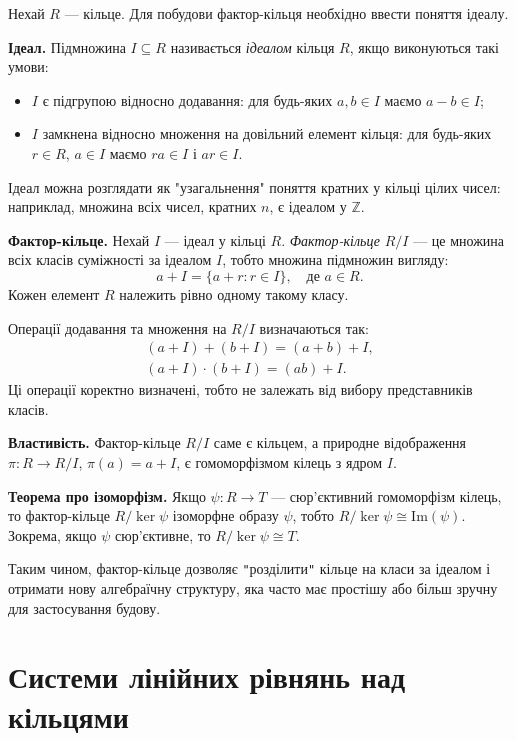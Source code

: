 Нехай \(R\) — кільце. Для побудови фактор-кільця необхідно ввести поняття ідеалу.

\textbf{Ідеал.} Підмножина \(I \subseteq R\) називається \emph{ідеалом} кільця \(R\), якщо виконуються такі умови:
\begin{itemize}
    \item \(I\) є підгрупою відносно додавання: для будь-яких \(a, b \in I\) маємо \(a-b \in I\);
    \item \(I\) замкнена відносно множення на довільний елемент кільця: для будь-яких \(r \in R\), \(a \in I\) маємо \(ra \in I\) і \(ar \in I\).
\end{itemize}
Ідеал можна розглядати як "узагальнення" поняття кратних у кільці цілих чисел: наприклад, множина всіх чисел, кратних \(n\), є ідеалом у \(\mathbb{Z}\).

\textbf{Фактор-кільце.} Нехай \(I\) — ідеал у кільці \(R\). \emph{Фактор-кільце} \(R/I\) — це множина всіх класів суміжності за ідеалом \(I\), тобто множина підмножин вигляду:
\[
    a + I = \{a + r : r \in I\}, \quad \text{де } a \in R.
\]
Кожен елемент \(R\) належить рівно одному такому класу.

Операції додавання та множення на \(R/I\) визначаються так:
\begin{gather*}
    (a + I) + (b + I) = (a + b) + I, \\
    (a + I) \cdot (b + I) = (ab) + I.
\end{gather*}
Ці операції коректно визначені, тобто не залежать від вибору представників класів.

\textbf{Властивість.} Фактор-кільце \(R/I\) саме є кільцем, а природне відображення \(\pi: R \to R/I\), \(\pi(a) = a + I\), є гомоморфізмом кілець з ядром \(I\).

\textbf{Теорема про ізоморфізм.} Якщо \(\psi: R \to T\) — сюр'єктивний гомоморфізм кілець, то фактор-кільце \(R/\ker\psi\) ізоморфне образу \(\psi\), тобто \(R/\ker\psi \cong \mathrm{Im}(\psi)\). Зокрема, якщо \(\psi\) сюр'єктивне, то \(R/\ker\psi \cong T\).

Таким чином, фактор-кільце дозволяє \texttt{"}розділити\texttt{"} кільце на класи за ідеалом і отримати нову алгебраїчну структуру, яка часто має простішу або більш зручну для застосування будову.

\section{Системи лінійних рівнянь над кільцями}
\label{sec:sle_theory}

